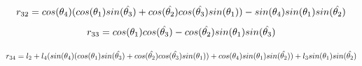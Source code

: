 \documentclass[conference]{IEEEtran}
\begin{document}
\begin{strip}
\begin{equation}
r_{32} = cos(\theta_{4})(  cos(\theta_{1})sin(\hat{\theta_{3}})+ cos(\hat{\theta_{2}})cos(\hat{\theta_{3}})sin(\theta_{1}))- sin(\theta_{4})sin(\theta_{1})sin(\hat{\theta_{2}})\\
\end{equation}
\begin{equation}
r_{33} = cos(\theta_{1})cos(\hat{\theta_{3}})- cos(\hat{\theta_{2}})sin(\theta_1)sin(\hat{\theta_{3}})\\
\end{equation}

\begin{equation}
r_{34} = l_{2}+ l_{4}( sin(\theta_{4})(  cos(\theta_{1})sin(\hat{\theta_{3}})+cos(\hat{\theta_{2}})cos(\hat{\theta_{3}})sin(\theta_{1})  )+ cos(\theta_{4})sin(\theta_{1})sin(\hat{\theta_{2}})   )+ l_{3}sin(\theta_{1})sin(\hat{\theta_{2}})\\
\end{equation}
\end{strip}
\end{document}
